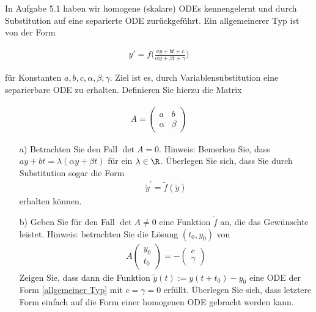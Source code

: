 \begin{exercise}
  In Aufgabe 5.1 haben wir homogene (skalare) ODEs kennengelernt und durch
  Substitution auf eine separierte ODE zurückgeführt. Ein allgemeinerer Typ ist
  von der Form

  \begin{align} \label{allgemeiner Typ}
    y' = f \bigg(\frac{ay + bt + c}{\alpha y + \beta t + \gamma}
    \bigg)
  \end{align}

  für Konstanten $a,b,c,\alpha ,\beta ,\gamma$. Ziel ist es, durch Variablensubstitution
  eine separierbare ODE zu erhalten. Definieren Sie hierzu die Matrix

  \begin{align*}
    A = \left(
      \begin{array}{cc}
        a & b \\
        \alpha & \beta
      \end{array}
    \right)
  \end{align*}

  \begin{itemize}
    \item[a)] Betrachten Sie den Fall $\det A = 0$. Hinweis: Bemerken Sie, dass
    $ay +bt = \lambda (\alpha y + \beta t)$ für ein $\lambda \in \R$. Überlegen
    Sie sich, dass Sie durch Substitution sogar die Form
    \begin{align*}
      \tilde{y}^{\prime}=\tilde{f}(\tilde{y})
    \end{align*}
    erhalten können.

    \item[b)] Geben Sie für den Fall $\det A \neq 0$ eine Funktion $\tilde{f}$ an,
    die das Gewünschte leistet. Hinweis: betrachten Sie die Lösung $(t_0 , y_0 )$
    von
    \begin{align*}
      A\left(
      \begin{array}{c}
        y_0 \\
        t_0
      \end{array}
      \right) = -\left(
      \begin{array}{c}
        c \\
        \gamma
      \end{array}
      \right)
    \end{align*}
    Zeigen Sie, dass dann die Funktion $\tilde{y}(t) := y(t + t_0 ) - y_0$ eine
    ODE der Form \eqref{allgemeiner Typ} mit $c = \gamma = 0$ erfüllt. Überlegen
    Sie sich, dass letztere Form einfach auf die Form einer homogenen ODE gebracht
    werden kann.
  \end{itemize}
\end{exercise}


